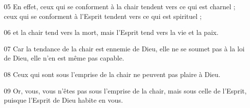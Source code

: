 
05 En effet, ceux qui se conforment à la chair tendent vers ce qui est charnel ; ceux qui se conforment à l’Esprit tendent vers ce qui est spirituel ;

06 et la chair tend vers la mort, mais l’Esprit tend vers la vie et la paix.

07 Car la tendance de la chair est ennemie de Dieu, elle ne se soumet pas à la loi de Dieu, elle n’en est même pas capable.

08 Ceux qui sont sous l’emprise de la chair ne peuvent pas plaire à Dieu.

09 Or, vous, vous n’êtes pas sous l’emprise de la chair, mais sous celle de l’Esprit, puisque l’Esprit de Dieu habite en vous. 
